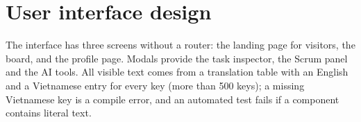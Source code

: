 \documentclass[../main.tex]{subfiles}
\begin{document}
\section{User interface design}
The interface has three screens without a router: the landing page for visitors, the board, and
the profile page. Modals provide the task inspector, the Scrum panel and the AI tools. All visible
text comes from a translation table with an English and a Vietnamese entry for every key (more than
500 keys); a missing Vietnamese key is a compile error, and an automated test fails if a component
contains literal text.
\end{document}

